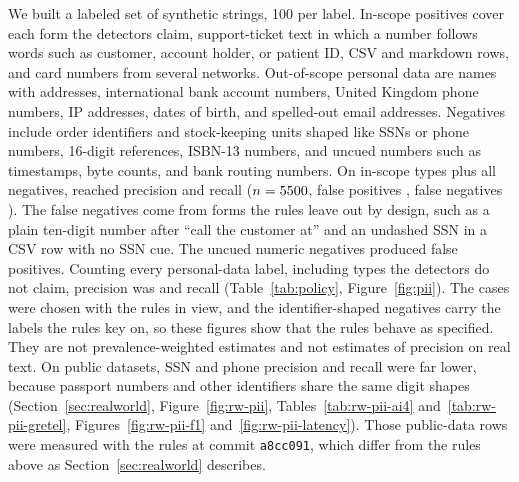 We built a labeled set of synthetic strings, 100 per label. In-scope positives cover each form the detectors claim, support-ticket text in which a number follows words such as customer, account holder, or patient ID, CSV and markdown rows, and card numbers from several networks. Out-of-scope personal data are names with addresses, international bank account numbers, United Kingdom phone numbers, IP addresses, dates of birth, and spelled-out email addresses. Negatives include order identifiers and stock-keeping units shaped like SSNs or phone numbers, 16-digit references, ISBN-13 numbers, and uncued numbers such as timestamps, byte counts, and bank routing numbers. On in-scope types plus all negatives,  reached precision \PiiInPrecision{} and recall \PiiInRecall{} (\(n=5500\), false positives \PiiInFp{}, false negatives \PiiInFn{}). The false negatives come from forms the rules leave out by design, such as a plain ten-digit number after ``call the customer at'' and an undashed SSN in a CSV row with no SSN cue. The \PiiNewNegN{} uncued numeric negatives produced \PiiNewNegFp{} false positives. Counting every personal-data label, including types the detectors do not claim, precision was \PiiAllPrecision{} and recall \PiiAllRecall{} (Table~\ref{tab:policy}, Figure~\ref{fig:pii}). The cases were chosen with the rules in view, and the identifier-shaped negatives carry the labels the rules key on, so these figures show that the rules behave as specified. They are not prevalence-weighted estimates and not estimates of precision on real text. On public datasets, SSN and phone precision and recall were far lower, because passport numbers and other identifiers share the same digit shapes (Section~\ref{sec:realworld}, Figure~\ref{fig:rw-pii}, Tables~\ref{tab:rw-pii-ai4} and~\ref{tab:rw-pii-gretel}, Figures~\ref{fig:rw-pii-f1} and~\ref{fig:rw-pii-latency}). Those public-data rows were measured with the rules at commit \texttt{a8cc091}, which differ from the rules above as Section~\ref{sec:realworld} describes.

